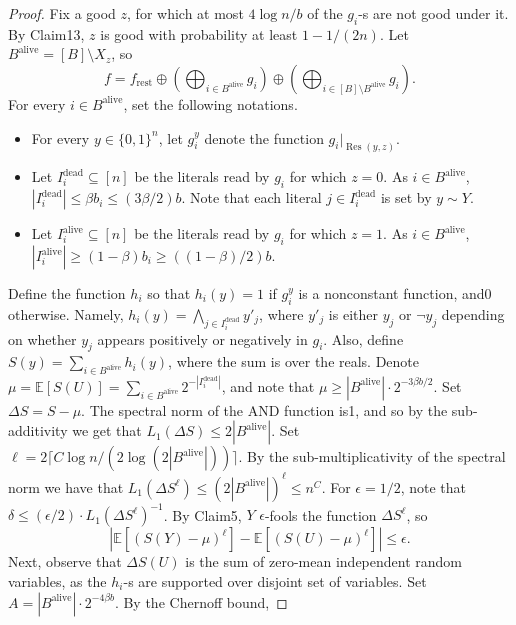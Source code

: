 \documentclass[10pt,a4paper]{article}
\begin{document}
\begin{proof}
Fix a good $z$, for which at most $4\log n/b$ of the $g_i$-s are not good under it. By Claim13, $z$ is good with probability at least $1-1/(2n)$. Let $B^{\mathrm{alive}}=[B]\setminus X_z$, so
\[
f=f_{\mathrm{rest}}\oplus\left(\bigoplus_{i\in B^{\mathrm{alive}}}g_i\right)\oplus\left(\bigoplus_{i\in[B]\setminus B^{\mathrm{alive}}}g_i\right).
\]
For every $i\in B^{\mathrm{alive}}$, set the following notations.
\begin{itemize}
\item For every $y\in\{0,1\}^n$, let $g_i^y$ denote the function $g_i|_{\operatorname{Res}(y,z)}$.
\item Let $I_i^{\mathrm{dead}}\subseteq[n]$ be the literals read by $g_i$ for which $z=0$. As $i\in B^{\mathrm{alive}}$, $|I_i^{\mathrm{dead}}|\le\beta b_i\le(3\beta/2)b$. Note that each literal $j\in I_i^{\mathrm{dead}}$ is set by $y\sim Y$.
\item Let $I_i^{\mathrm{alive}}\subseteq[n]$ be the literals read by $g_i$ for which $z=1$. As $i\in B^{\mathrm{alive}}$, $|I_i^{\mathrm{alive}}|\ge(1-\beta)b_i\ge((1-\beta)/2)b$.
\end{itemize}
Define the function $h_i$ so that $h_i(y)=1$ if $g_i^y$ is a nonconstant function, and0 otherwise. Namely, $h_i(y)=\bigwedge_{j\in I_i^{\mathrm{dead}}}y'_j$, where $y'_j$ is either $y_j$ or $\neg y_j$ depending on whether $y_j$ appears positively or negatively in $g_i$. Also, define $S(y)=\sum_{i\in B^{\mathrm{alive}}}h_i(y)$, where the sum is over the reals. Denote $\mu=\mathbb E[S(U)]=\sum_{i\in B^{\mathrm{alive}}}2^{-|I_i^{\mathrm{dead}}|}$, and note that $\mu\ge|B^{\mathrm{alive}}|\cdot2^{-3\beta b/2}$.
Set $\Delta S=S-\mu$. The spectral norm of the AND function is1, and so by the sub-additivity we get that $L_1(\Delta S)\le2|B^{\mathrm{alive}}|$. Set $\ell=2\lceil C\log n/(2\log(2|B^{\mathrm{alive}}|))\rceil$. By the sub-multiplicativity of the spectral norm we have that $L_1(\Delta S^\ell)\le(2|B^{\mathrm{alive}}|)^\ell\le n^C$.
For $\epsilon=1/2$, note that $\delta\le(\epsilon/2)\cdot L_1(\Delta S^\ell)^{-1}$. By Claim5, $Y$ $\epsilon$-fools the function $\Delta S^\ell$, so
\begin{equation}
|\mathbb E[(S(Y)-\mu)^\ell]-\mathbb E[(S(U)-\mu)^\ell]|\le\epsilon.\tag{5}
\end{equation}
Next, observe that $\Delta S(U)$ is the sum of zero-mean independent random variables, as the $h_i$-s are supported over disjoint set of variables. Set $A=|B^{\mathrm{alive}}|\cdot2^{-4\beta b}$. By the Chernoff bound,

\end{proof}
\end{document}
